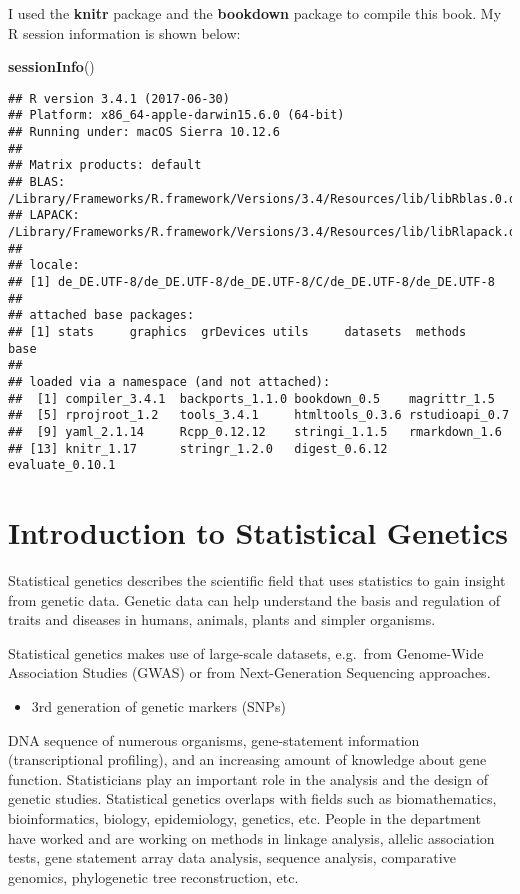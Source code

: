 \documentclass[12pt,]{krantz}
\newenvironment{Shaded}{\begin{snugshade}}{\end{snugshade}}
\newcommand{\KeywordTok}[1]{\textcolor[rgb]{0.27,0.27,0.27}{\textbf{#1}}}
\newcommand{\NormalTok}[1]{#1}
\providecommand{\tightlist}{%
  \setlength{\itemsep}{0pt}\setlength{\parskip}{0pt}}
\renewenvironment{quote}{\begin{VF}}{\end{VF}}
\theoremstyle{definition}
\theoremstyle{definition}
\theoremstyle{definition}
\theoremstyle{remark}
\begin{document}
I used the \textbf{knitr} package and the
\textbf{bookdown} package to compile this book. My R
session information is shown below:

\begin{Shaded}
\begin{Highlighting}[]
\KeywordTok{sessionInfo}\NormalTok{()}
\end{Highlighting}
\end{Shaded}

\begin{verbatim}
## R version 3.4.1 (2017-06-30)
## Platform: x86_64-apple-darwin15.6.0 (64-bit)
## Running under: macOS Sierra 10.12.6
## 
## Matrix products: default
## BLAS: /Library/Frameworks/R.framework/Versions/3.4/Resources/lib/libRblas.0.dylib
## LAPACK: /Library/Frameworks/R.framework/Versions/3.4/Resources/lib/libRlapack.dylib
## 
## locale:
## [1] de_DE.UTF-8/de_DE.UTF-8/de_DE.UTF-8/C/de_DE.UTF-8/de_DE.UTF-8
## 
## attached base packages:
## [1] stats     graphics  grDevices utils     datasets  methods   base     
## 
## loaded via a namespace (and not attached):
##  [1] compiler_3.4.1  backports_1.1.0 bookdown_0.5    magrittr_1.5   
##  [5] rprojroot_1.2   tools_3.4.1     htmltools_0.3.6 rstudioapi_0.7 
##  [9] yaml_2.1.14     Rcpp_0.12.12    stringi_1.1.5   rmarkdown_1.6  
## [13] knitr_1.17      stringr_1.2.0   digest_0.6.12   evaluate_0.10.1
\end{verbatim}

\mainmatter

\chapter{Introduction to Statistical
Genetics}\label{introduction-to-statistical-genetics}

Statistical genetics describes the scientific field that uses statistics
to gain insight from genetic data. Genetic data can help understand the
basis and regulation of traits and diseases in humans, animals, plants
and simpler organisms.

Statistical genetics makes use of large-scale datasets, e.g.~from
Genome-Wide Association Studies (GWAS) or from Next-Generation
Sequencing approaches.

\begin{itemize}
\tightlist
\item
  3rd generation of genetic markers (SNPs)
\end{itemize}

\begin{quote}
DNA sequence of numerous organisms, gene-statement information
(transcriptional profiling), and an increasing amount of knowledge about
gene function. Statisticians play an important role in the analysis and
the design of genetic studies. Statistical genetics overlaps with fields
such as biomathematics, bioinformatics, biology, epidemiology, genetics,
etc. People in the department have worked and are working on methods in
linkage analysis, allelic association tests, gene statement array data
analysis, sequence analysis, comparative genomics, phylogenetic tree
reconstruction, etc.
\end{quote}
\end{document}
